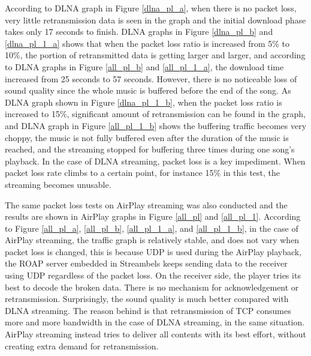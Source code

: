 According to DLNA graph in Figure \ref{dlna_pl_a}, when there is no packet
loss, very little retransmission data is seen in the graph and the initial
download phase takes only 17 seconds to finish. DLNA graphs in Figure
\ref{dlna_pl_b} and \ref{dlna_pl_1_a} shows that when the packet loss ratio is
increased from 5\% to 10\%, the portion of retransmitted data is getting larger
and larger, and according to DLNA graphs in Figure \ref{all_pl_b} and
\ref{all_pl_1_a}, the download time increased from 25 seconds to 57 seconds.
However, there is no noticeable loss of sound quality since the whole music is
buffered before the end of the song. As DLNA graph shown in Figure
\ref{dlna_pl_1_b}, when the packet loss ratio is increased to 15\%, significant
amount of retransmission can be found in the graph, and DLNA graph in Figure
\ref{all_pl_1_b} shows the buffering traffic becomes very choppy, the music
is not fully buffered even after the duration of the music is reached, and the
streaming stopped for buffering three times during one song's playback. In the
case of DLNA streaming, packet loss is a key impediment. When packet loss rate
climbs to a certain point, for instance 15\% in this test, the streaming
becomes unusable.

The same packet loss tests on AirPlay streaming was also conducted and the
results are shown in AirPlay graphs in Figure \ref{all_pl} and \ref{all_pl_1}.
According to Figure \ref{all_pl_a}, \ref{all_pl_b}, \ref{all_pl_1_a}, and
\ref{all_pl_1_b}, in the case of AirPlay streaming, the traffic graph is
relatively stable, and does not vary when packet loss is changed, this is
because UDP is used during the AirPlay playback, the ROAP server embedded in
Streambels keeps sending data to the receiver using UDP regardless of the
packet loss. On the receiver side, the player tries its best to decode the
broken data. There is no mechanism for acknowledgement or retransmission.
Surprisingly, the sound quality is much better compared with DLNA streaming.
The reason behind is that retransmission of TCP consumes more and more
bandwidth in the case of DLNA streaming, in the same situation.
AirPlay streaming instead tries to deliver all contents with its best effort,
without creating extra demand for retransmission.

